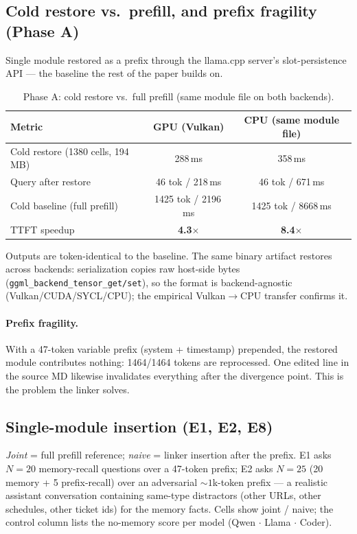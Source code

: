 \documentclass[11pt]{article}
\newcommand{\code}[1]{\texttt{#1}}
\begin{document}
\subsection{Cold restore vs.\ prefill, and prefix fragility (Phase A)}
\label{sec:phasea}

Single module restored as a prefix through the llama.cpp server's slot-persistence API --- the baseline the rest of the paper builds on.

\begin{table}[h]
  \centering\small
  \caption{Phase A: cold restore vs.\ full prefill (same module file on both backends).}
  \begin{tabular}{lcc}
    \toprule
    Metric & GPU (Vulkan) & CPU (same module file) \\
    \midrule
    Cold restore (1380 cells, 194\,MB) & 288\,ms & 358\,ms \\
    Query after restore & 46 tok / 218\,ms & 46 tok / 671\,ms \\
    Cold baseline (full prefill) & 1425 tok / 2196\,ms & 1425 tok / 8668\,ms \\
    TTFT speedup & \textbf{4.3$\times$} & \textbf{8.4$\times$} \\
    \bottomrule
  \end{tabular}
\end{table}

Outputs are token-identical to the baseline. The same binary artifact restores across backends: serialization copies raw host-side bytes (\code{ggml\_backend\_tensor\_get/set}), so the format is backend-agnostic (Vulkan/CUDA/SYCL/CPU); the empirical Vulkan$\to$CPU transfer confirms it.

\paragraph{Prefix fragility.}
With a 47-token variable prefix (system + timestamp) prepended, the restored module contributes nothing: 1464/1464 tokens are reprocessed. One edited line in the source MD likewise invalidates everything after the divergence point. This is the problem the linker solves.

\subsection{Single-module insertion (E1, E2, E8)}
\label{sec:single}

\emph{Joint} = full prefill reference; \emph{naive} = linker insertion after the prefix. E1 asks $N{=}20$ memory-recall questions over a 47-token prefix; E2 asks $N{=}25$ (20 memory + 5 prefix-recall) over an adversarial ${\sim}1$k-token prefix --- a realistic assistant conversation containing same-type distractors (other URLs, other schedules, other ticket ids) for the memory facts. Cells show joint / naive; the control column lists the no-memory score per model (Qwen $\cdot$ Llama $\cdot$ Coder).
\end{document}

